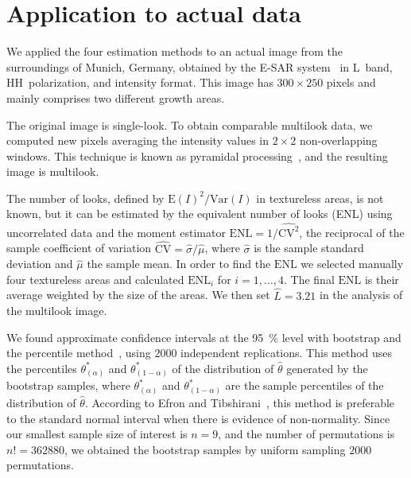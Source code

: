 \documentclass[twocolumn]{svjour3}
\begin{document}
\section{Application to actual data}
\label{application}

We applied the four estimation methods to an actual image from the surroundings of Munich, Germany, obtained by the E-SAR system~\cite{Horn1996} in L~band, HH~polarization, and intensity format. 
This image has $300\times250$ pixels and mainly comprises two different growth areas.

The original image is single-look.
To obtain comparable multilook data, we computed new pixels averaging the intensity values in $2\times2$ non-overlapping windows. This technique is known as pyramidal processing~\cite{Adelson1984}, and the resulting image is multilook.

The number of looks, defined by ${\text{E}(I)^2}/{\text{Var}(I)}$ in textureless areas, is not known, but it can be estimated by the equivalent number of looks (ENL) using uncorrelated data and the moment estimator
$\text{ENL}={1}/{\widehat{\text{CV}^2}}$, the reciprocal of the sample coefficient of variation $\widehat{\text{CV}}={\widehat{\sigma}}/{\widehat\mu}$, where $\widehat{\sigma}$ is the sample standard deviation and $\widehat\mu$ the sample mean.
In order to find the $\text{ENL}$ we selected manually four textureless areas and calculated $\text{ENL}_i$ for $i=1, \ldots, 4$. 
The final $\text{ENL}$ is their average weighted by the size of the areas. 
We then set $\widehat L=3.21$ in the analysis of the multilook image.

We found approximate confidence intervals at the \SI{95}{\percent} level with bootstrap and the percentile method~\cite{Davison1997}, using $2000$ independent replications.
This method uses the percentiles $\theta^*_{(\alpha)}$ and $\theta^*_{(1-\alpha)}$ of the distribution of $\widehat{\theta} $ generated by the bootstrap samples, where $\theta^*_{(\alpha)}$ and $\theta^*_{(1-\alpha)}$ are the sample percentiles of the distribution of $\widehat{\theta} $. 
According to Efron and Tibshirani~\cite{Efron93}, this method is preferable to the standard normal interval when there is evidence of non-normality.
Since our smallest sample size of interest is $n=9$, and the number of permutations is $n!=362880$, we obtained the bootstrap samples by uniform sampling $2000$ permutations.
\end{document}
